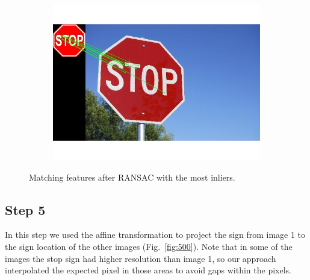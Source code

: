 \documentclass[a4paper]{iacas}
\begin{document}
\begin{figure}[!htbp]
\begin{subfigure}[b]{0.32\textwidth}
		\caption{}
		\label{fig:403}
	\end{subfigure}
	\begin{subfigure}[b]{0.32\textwidth}
		\includegraphics[width=\textwidth]{404.jpg}
		\caption{}
		\label{fig:404}
	\end{subfigure}
	
	\caption{Matching features after RANSAC with the most inliers.}
	\label{fig:400}
\end{figure}

\subsection{Step 5}

In this step we used the affine transformation to project the sign from image 1 to the sign location of the other images (Fig.~\ref{fig:500}). Note that in some of the images the stop sign had higher resolution than image 1, so our approach interpolated the expected pixel in those areas to avoid gaps within the pixels.
\end{document}
